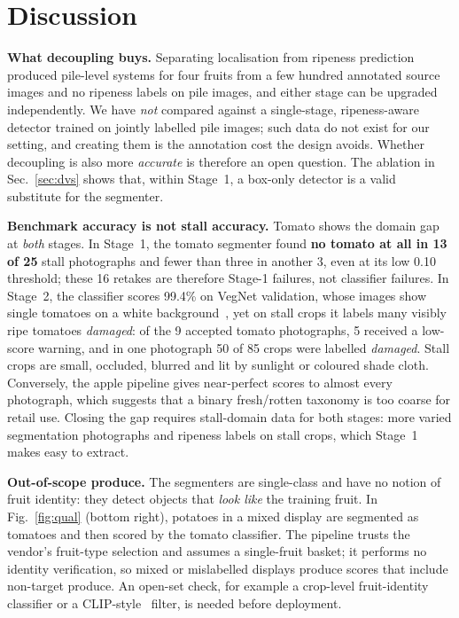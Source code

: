 \documentclass[10pt,twocolumn]{article}
\begin{document}
\section{Discussion}\label{sec:discussion}
\textbf{What decoupling buys.} Separating localisation from ripeness prediction produced pile-level systems for four fruits from a few hundred annotated source images and no ripeness labels on pile images, and either stage can be upgraded independently. We have \emph{not} compared against a single-stage, ripeness-aware detector trained on jointly labelled pile images; such data do not exist for our setting, and creating them is the annotation cost the design avoids. Whether decoupling is also more \emph{accurate} is therefore an open question. The ablation in Sec.~\ref{sec:dvs} shows that, within Stage~1, a box-only detector is a valid substitute for the segmenter.

\textbf{Benchmark accuracy is not stall accuracy.} Tomato shows the domain gap at \emph{both} stages. In Stage~1, the tomato segmenter found \textbf{no tomato at all in 13 of 25} stall photographs and fewer than three in another 3, even at its low 0.10 threshold; these 16 retakes are therefore Stage-1 failures, not classifier failures. In Stage~2, the classifier scores 99.4\% on VegNet validation, whose images show single tomatoes on a white background~\cite{vegnet}, yet on stall crops it labels many visibly ripe tomatoes \emph{damaged}: of the 9 accepted tomato photographs, 5 received a low-score warning, and in one photograph 50 of 85 crops were labelled \emph{damaged}. Stall crops are small, occluded, blurred and lit by sunlight or coloured shade cloth. Conversely, the apple pipeline gives near-perfect scores to almost every photograph, which suggests that a binary fresh/rotten taxonomy is too coarse for retail use. Closing the gap requires stall-domain data for both stages: more varied segmentation photographs and ripeness labels on stall crops, which Stage~1 makes easy to extract.

\textbf{Out-of-scope produce.} The segmenters are single-class and have no notion of fruit identity: they detect objects that \emph{look like} the training fruit. In Fig.~\ref{fig:qual} (bottom right), potatoes in a mixed display are segmented as tomatoes and then scored by the tomato classifier. The pipeline trusts the vendor's fruit-type selection and assumes a single-fruit basket; it performs no identity verification, so mixed or mislabelled displays produce scores that include non-target produce. An open-set check, for example a crop-level fruit-identity classifier or a CLIP-style~\cite{radford2021clip} filter, is needed before deployment.
\end{document}
